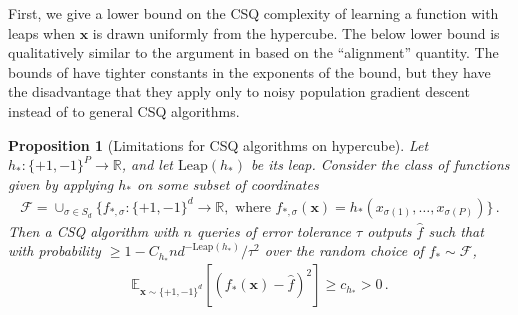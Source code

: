 \documentclass[11pt]{article}
\newcommand{\E}{\mathbb{E}}
\newcommand{\R}{\mathbb{R}}
\newcommand{\<}{\langle}
\renewcommand{\>}{\rangle}
\newtheorem{proposition}{Proposition}
\theoremstyle{definition}
\def\bx{{\boldsymbol x}}
\def\cF{{\mathcal F}}
\def\bx{{\boldsymbol x}}
\def\cF{{\mathcal F}}
\def\Leap{\mathrm{Leap}}
\begin{document}
First, we give a lower bound on the CSQ complexity of learning a function with leaps when $\bx$ is drawn uniformly from the hypercube. The below lower bound is qualitatively similar to the argument in \cite{abbe2022non} based on the ``alignment'' quantity. The bounds of \cite{abbe2022non} have tighter constants in the exponents of the bound, but they have the disadvantage that they apply only to noisy population gradient descent instead of to general CSQ algorithms.
\begin{proposition}[Limitations for CSQ algorithms on hypercube]\label{prop:leap-csq-boolean}
Let $h_* : \{+1,-1\}^P \to \R$, and let $\Leap(h_*)$ be its leap. Consider the class of functions given by applying $h_*$ on some subset of coordinates
\begin{align*}
\cF = \cup_{\sigma \in S_d} \{f_{*,\sigma} : \{+1,-1\}^d \to \R, \mbox{ where } f_{*,\sigma}(\bx) = h_*(x_{\sigma(1)},\ldots,x_{\sigma(P)})\}\,.
\end{align*}
Then a CSQ algorithm with $n$ queries of error tolerance $\tau$ outputs $\hat{f}$ such that with probability $\geq 1 - C_{h_*}nd^{-\Leap(h_*)} / \tau^2$ over the random choice of $f_* \sim \cF$,
\begin{align*}
\E_{\bx \sim \{+1,-1\}^d}[(f_*(\bx) - \hat{f})^2] \geq c_{h_*} > 0\,.
\end{align*}
\end{proposition}
\end{document}
